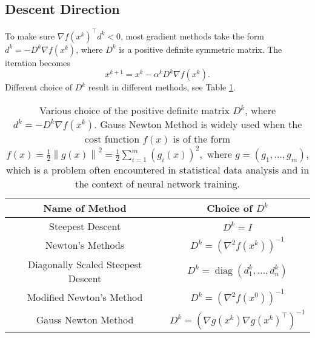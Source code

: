 \documentclass[12pt,a4paper]{article}
\numberwithin{equation}{section}
\theoremstyle{mystyle}
\newcommand{\grad}{\nabla}
\newcommand{\T}{\top}
\newcommand{\diag}{\operatorname{diag}}
\newcommand{\norm}[1]{\left\lVert #1 \right\rVert}
\begin{document}
	\subsection{Descent Direction}
	To make sure $\grad f(x^k)^\T d^k<0$, most gradient methods take the form $d^k =-D^k \grad f(x^k)$, where $D^k$ is a positive definite symmetric matrix. The iteration becomes
	\begin{equation}
		x^{k+1} = x^k -\alpha^k D^k \grad f(x^k).
	\end{equation}
	Different choice of $D^k$ result in different methods, see Table \ref{table:descent direction}.
	\begin{table}[]
		\centering
		\begin{tabular}{@{}cc@{}}
			\toprule
			Name of Method                     & Choice of $D^k$                                                                                                                                 \\ \midrule
			Steepest Descent                   & $D^k = I$                                                                                                                                       \\
			Newton's Methods                   & $D^k=\left(\grad^2 f(x^k)\right)^{-1}$                                                                                                          \\
			Diagonally Scaled Steepest Descent & $D^k=\diag(d_1^k,\dots,d_n^k)$                                                                                                                  \\
			Modified Newton's Method           & $D^k=\left(\grad^2 f(x^0)\right)^{-1}$                                                                                                          \\
			Gauss Newton Method                & $D^k=(\grad g(x^k)\grad g(x^k)^\T)^{-1}$\\ \bottomrule
		\end{tabular}
	\caption{
		Various choice of the positive definite matrix $D^k$, where $d^k=-D^k \grad f(x^k)$. Gauss Newton Method is widely used when the cost function $f(x)$ is of the form 
		$f(x)=\frac{1}{2}\norm{g(x)}^2=\frac{1}{2}\sum_{i=1}^m (g_i(x))^2,$
		where $g=(g_1,\dots,g_m)$, which is a problem often encountered in statistical data analysis and in the context of neural network training.}
	\label{table:descent direction}
	\end{table}
	
\end{document}
